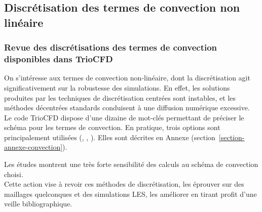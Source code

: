 \subsection{Discr\'etisation des termes de convection non lin\'eaire}
\label{section-Skew}

\subsubsection{Revue des discr\'etisations des termes de convection disponibles dans TrioCFD }

On s'int\'eresse aux termes de convection non-lin\'eaire, dont la discr\'etisation agit significativement sur la robustesse des simulations. En effet, les solutions produites par les techniques de discr\'etisation centr\'ees sont instables, et  les m\'ethodes d\'ecentr\'ees  standards conduisent \`a une diffusion num\'erique excessive. Le code TrioCFD dispose d'une dizaine de mot-cl\'es permettant de pr\'eciser le sch\'ema pour les termes de convection. En pratique, trois options sont principalement utilis\'ees ({}, {}, {}). Elles sont d\'ecrites en Annexe  (section~\ref{section-annexe-convection}). 

Les \'etudes montrent une tr\`es forte sensibilit\'e des calculs au sch\'ema de convection choisi. \\
Cette action vise \`a revoir ces m\'ethodes de discr\'etisation, les \'eprouver sur des maillages quelconques et des simulations LES,  les am\'eliorer en tirant profit d'une veille bibliographique.


